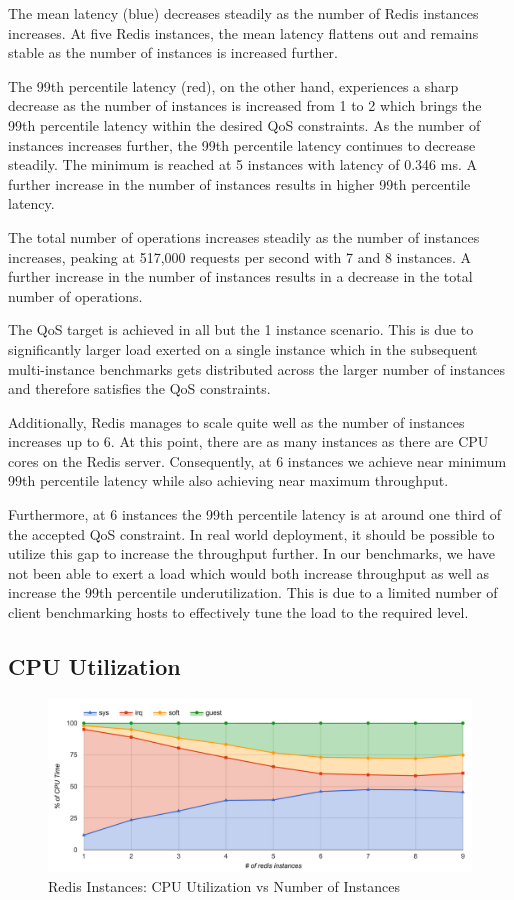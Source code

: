 The mean latency (blue) decreases steadily as the number of Redis instances increases. At five Redis instances, the mean latency flattens out and remains stable as the number of instances is increased further.

The 99th percentile latency (red), on the other hand, experiences a sharp decrease as the number of instances is increased from 1 to 2 which brings the 99th percentile latency within the desired QoS constraints. As the number of instances increases further, the 99th percentile latency continues to decrease steadily. The minimum is reached at 5 instances with latency of 0.346 ms. A further increase in the number of instances results in higher 99th percentile latency.

The total number of operations increases steadily as the number of instances increases, peaking at 517,000 requests per second with 7 and 8 instances. A further increase in the number of instances results in a decrease in the total number of operations.

The QoS target is achieved in all but the 1 instance scenario. This is due to significantly larger load exerted on a single instance which in the subsequent multi-instance benchmarks gets distributed across the larger number of instances and therefore satisfies the QoS constraints.

Additionally, Redis manages to scale quite well as the number of instances increases up to 6. At this point, there are as many instances as there are CPU cores on the Redis server. Consequently, at 6 instances we achieve near minimum 99th percentile latency while also achieving near maximum throughput.

Furthermore, at 6 instances the 99th percentile latency is at around one third of the accepted QoS constraint. In real world deployment, it should be possible to utilize this gap to increase the throughput further. In our benchmarks, we have not been able to exert a load which would both increase throughput as well as increase the 99th percentile underutilization. This is due to a limited number of client benchmarking hosts to effectively tune the load to the required level.


\subsection{CPU Utilization}

\begin{figure}[h]
    \includegraphics[width=\textwidth]{./res/6_instances_cpu.png}
    \caption{Redis Instances: CPU Utilization vs Number of Instances}
    \label{fig:6_instances_cpu.png}
\end{figure}

